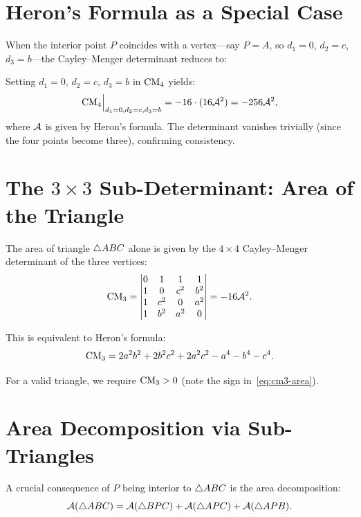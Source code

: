 \section{Heron's Formula as a Special Case}

When the interior point $P$ coincides with a vertex---say $P = A$, so $d_1 = 0$, $d_2 = c$, $d_3 = b$---the Cayley--Menger determinant reduces to:

\begin{proposition}
\label{prop:heron-reduction}
Setting $d_1 = 0$, $d_2 = c$, $d_3 = b$ in $\mathrm{CM}_4$ yields:
\begin{equation}
\mathrm{CM}_4 \Big|_{d_1=0, d_2=c, d_3=b} = -16 \cdot (16 \mathcal{A}^2) = -256 \mathcal{A}^2,
\end{equation}
where $\mathcal{A}$ is given by Heron's formula. The determinant vanishes trivially (since the four points become three), confirming consistency.
\end{proposition}

\section{The $3 \times 3$ Sub-Determinant: Area of the Triangle}

The area of triangle $\triangle ABC$ alone is given by the $4 \times 4$ Cayley--Menger determinant of the three vertices:
\begin{equation}
\label{eq:cm3-area}
\mathrm{CM}_3 = \begin{vmatrix}
0 & 1 & 1 & 1 \\
1 & 0 & c^2 & b^2 \\
1 & c^2 & 0 & a^2 \\
1 & b^2 & a^2 & 0
\end{vmatrix} = -16\mathcal{A}^2.
\end{equation}

This is equivalent to Heron's formula:
\begin{equation}
\mathrm{CM}_3 = 2a^2 b^2 + 2b^2 c^2 + 2a^2 c^2 - a^4 - b^4 - c^4.
\end{equation}

For a valid triangle, we require $\mathrm{CM}_3 > 0$ (note the sign in~\eqref{eq:cm3-area}).

\section{Area Decomposition via Sub-Triangles}

A crucial consequence of $P$ being interior to $\triangle ABC$ is the area decomposition:
\begin{equation}
\label{eq:area-decomposition}
\mathcal{A}(\triangle ABC) = \mathcal{A}(\triangle BPC) + \mathcal{A}(\triangle APC) + \mathcal{A}(\triangle APB).
\end{equation}

